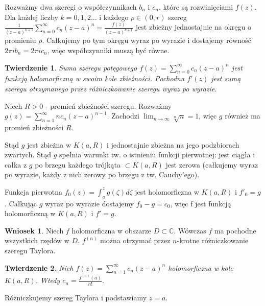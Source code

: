 \documentclass[11pt]{article}
\theoremstyle{plain}
\newtheorem*{theorem}{Twierdzenie}
\theoremstyle{definition}
\newtheorem*{corollary}{Wniosek}
\theoremstyle{remark}
\let\oldendproof\endproof
\renewenvironment{proof}[1][\proofname]{
  \oldproof[\textsc{\small #1}]
}{\oldendproof}
\begin{document}
\begin{proof}
  Rozważmy dwa szeregi o współczynnikach $ b_n $ i $ c_n $, które są rozwinięciami $ f(z) $.
  Dla każdej liczby $ k = 0, 1, 2\dots $ i każdego $ \rho \in (0, r) $ szereg $ \frac{1}{(z-a)^{k+1}} \sum_{n=0}^{\infty} c_{n}(z-a)^n = \frac{f(z)}{(z-a)^{k+1}} $ jest zbieżny jednostajnie na okręgu o promieniu $ \rho $.
  Całkujemy po tym okręgu wyraz po wyrazie i dostajemy równość $ 2 \pi i b_n = 2 \pi i c_n $, więc współczynniki muszą być równe.
\end{proof}

\begin{theorem}
  Suma szeregu potęgowego $ f(z) = \sum_{n=0}^{\infty} c_{n}(z-a)^{n} $ jest funkcją holomorficzną w swoim kole zbieżności.
  Pochodna $ f'(z) $ jest sumą szeregu otrzymanego przez różniczkowanie szeregu wyraz po wyrazie.
\end{theorem}

\begin{proof}
  Niech $ R>0 $ - promień zbieżności szeregu. Rozważmy $ g(z) = \sum_{n=1}^{\infty} nc_{n}(z-a)^{n-1} $.
  Zachodzi $ \lim_{n \to \infty} \sqrt[n]{n} = 1 $, więc $ g $ również ma promień zbieżności $ R $.

  Stąd $ g $ jest zbieżna w $ K(a, R) $ i jednostajnie zbieżna na jego podzbiorach zwartych.
  Stąd $ g $ spełnia warunki tw. o istnieniu funkcji pierwotnej:
  jest ciągła
  i całka z $ g $ po brzegu każdego trójkąta $ \subset K(a, R) $ jest zerowa (całkujemy wyraz po wyrazie, każdy z nich zerowy po brzegu z tw. Cauchy'ego).

  Funkcja pierwotna $ f_0(z) = \int_{a}^{z} g(\zeta) d\zeta $ jest holomorficzna w $ K(a, R) $ i $ f'_0 = g $.
  Całkując $ g $ wyraz po wyrazie dostajemy $ f_0 - g = c_0 $, więc f jest funkcją holomorficzną w $ K(a, R) $ i $ f' = g $.
\end{proof}

\begin{corollary}
  Niech $ f $ holomorficzna w obszarze $ D \subset \mathbb{C} $. Wówczas $ f $ ma pochodne wszystkich rzędów w $ D $.
  $ f^{(n)} $ można otrzymać przez $ n $-krotne różniczkowanie szeregu Taylora.
\end{corollary}

\begin{theorem}
  Nieh $ f(z) = \sum_{n=1}^{\infty} c_{n}(z-a)^{n} $ holomorficzna w kole $ K(a, R) $.
  Wtedy $ c_{n} = \frac{f^{(n)}(a)}{n!} $.
\end{theorem}

\begin{proof}
  Różniczkujemy szereg Taylora i podstawiamy $ z = a $.
\end{proof}
\end{document}

